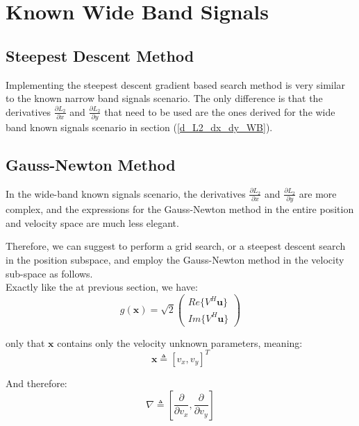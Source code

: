 \section{Known Wide Band Signals}

\subsection{Steepest Descent Method}

Implementing the steepest descent gradient based search method is very similar to the known narrow band signals scenario. The only difference is that the derivatives $\frac{\partial L_2}{\partial x}$ and $\frac{\partial L_2}{\partial y}$ that need to be used are the ones derived for the wide band known signals scenario in section (\ref{d_L2_dx_dy_WB}).

\subsection{Gauss-Newton Method}

In the wide-band known signals scenario, the derivatives $\frac{\partial L_2}{\partial x}$ and $\frac{\partial L_2}{\partial y}$ are more complex, and the expressions for the Gauss-Newton method in the entire position and velocity space are much less elegant.

Therefore, we can suggest to perform a grid search, or a steepest descent search in the position subspace, and employ the Gauss-Newton method in the velocity sub-space as follows.\\

Exactly like the at previous section, we have:
\begin{equation}
g(\mathbf{x})=\sqrt{2} \begin{pmatrix} Re\{V^H \mathbf{u}\} \\Im\{V^H \mathbf{u}\} \end{pmatrix}
\end{equation}

only that $\mathbf{x}$ contains only the velocity unknown parameters, meaning: 
\begin{equation}
\mathbf{x} \triangleq \left[ v_x, v_y \right]^T
\end{equation}

And therefore:
\begin{equation}
\nabla \triangleq \left[\frac{\partial}{\partial v_x},
\frac{\partial}{\partial v_y}\right]
\end{equation}

